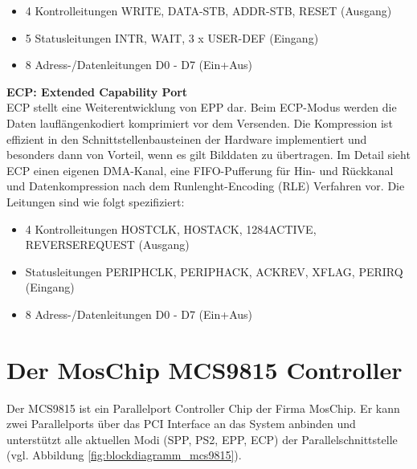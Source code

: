 \documentclass[a4paper,11pt]{article}
\begin{document}
\begin{itemize}
\item 4 Kontrolleitungen WRITE, DATA-STB, ADDR-STB, RESET (Ausgang)
\item 5 Statusleitungen INTR, WAIT, 3 x USER-DEF (Eingang)
\item 8 Adress-/Datenleitungen D0 - D7 (Ein+Aus) \end{itemize}
\noindent
\textbf{ECP: Extended Capability Port}
\\
ECP stellt eine Weiterentwicklung von EPP dar. Beim ECP-Modus werden die Daten lauflängenkodiert komprimiert vor dem Versenden. Die Kompression ist effizient in den Schnittstellenbausteinen der Hardware implementiert und besonders dann von Vorteil, wenn es gilt Bilddaten zu übertragen. Im Detail sieht ECP einen eigenen DMA-Kanal, eine FIFO-Pufferung für Hin- und Rückkanal und Datenkompression nach dem Runlenght-Encoding (RLE) Verfahren vor. Die Leitungen sind wie folgt spezifiziert:

\begin{itemize}
\item 4 Kontrolleitungen HOSTCLK, HOSTACK, 1284ACTIVE, REVERSEREQUEST (Ausgang)
\item Statusleitungen PERIPHCLK, PERIPHACK, ACKREV, XFLAG, PERIRQ (Eingang)
\item 8 Adress-/Datenleitungen D0 - D7 (Ein+Aus) \end{itemize}


\section{Der MosChip MCS9815 Controller}

Der MCS9815 ist ein Parallelport Controller Chip der Firma MosChip. Er kann
zwei Parallelports über das PCI Interface an das System anbinden und unterstützt alle
aktuellen Modi (SPP, PS2, EPP, ECP) der Parallelschnittstelle (vgl. Abbildung \ref{fig:blockdiagramm_mcs9815}).
\end{document}
